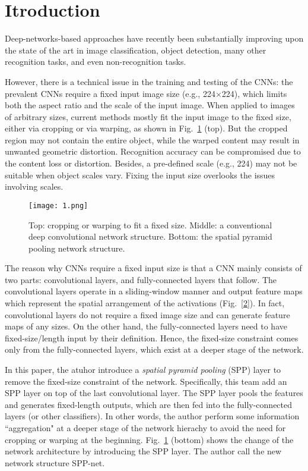 \documentclass[10pt,twocolumn,letterpaper]{article}
\begin{document}
\section{Itroduction}
Deep-networks-based approaches have recently been substantially improving upon the state of the art in image classification\cite{Krizhevsky2012ImageNet}, object detection\cite{Rich}, many other recognition tasks\cite{Taigman2014DeepFace}, and even non-recognition tasks.
\par
However, there is a technical issue in the training and testing of the CNNs: the prevalent CNNs require a fixed input image size (e.g., 224$\times$224), which limits both the aspect ratio and the scale of the input image. When applied to images of arbitrary sizes, current methods mostly fit the input image to the fixed size, either via cropping\cite{Krizhevsky2012ImageNet} or via warping, as shown in Fig.~\ref{1} (top). But the cropped region may not contain the entire object, while the warped content may result in unwanted geometric distortion. Recognition accuracy can be compromised due to the content loss or distortion. Besides, a pre-defined scale (e.g., 224) may not be suitable when object scales vary. Fixing the input size overlooks the issues involving scales.
\begin{figure}
\begin{center}
  \texttt{[image: 1.png]}\\
  \caption{Top: cropping or warping to fit a fixed size. Middle: a
conventional deep convolutional network structure. Bottom: the spatial pyramid pooling network structure.}\label{1}
\end{center}
\end{figure}
\par
The reason why CNNs require a fixed input size is that a CNN mainly  consists of two parts: convolutional layers, and fully-connected layers that follow. The convolutional layers operate in a sliding-window manner and output feature maps which represent the spatial arrangement of the activations (Fig.~\ref{2}). In fact, convolutional layers do not require
a fixed image size and can generate feature maps of any sizes. On the other hand, the fully-connected layers need to have fixed-size/length input by their definition. Hence, the fixed-size constraint comes only from the fully-connected layers, which exist at a deeper stage of the network.
\par
In this paper, the atuhor introduce a \emph{spatial pyramid pooling} (SPP) layer to remove the fixed-size constraint of the network. Specifically, this team add an SPP layer on top of the last convolutional layer. The SPP layer pools the features and generates fixed-length outputs, which are then fed into the fully-connected layers (or other classifiers). In other words, the author perform some information ``aggregation" at a deeper stage of the network hierachy to avoid the need for cropping or warping at the beginning. Fig.~\ref{1} (bottom) shows the change of the network architecture by introducing the SPP layer. The author call the new network structure SPP-net.
\end{document}
